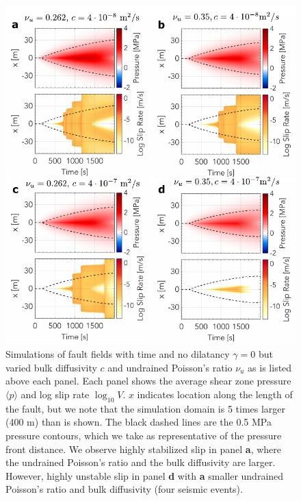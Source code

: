 \documentclass[draft]{agujournal2019}
\begin{document}
\begin{figure}[H]
\centering
\includegraphics[scale = 0.95]{Figures/gamma0_comparison.pdf} %
\caption{Simulations of fault fields with time and no dilatancy $\gamma = 0$ but varied bulk diffusivity $c$ and undrained Poisson's ratio $\nu_u$ as is listed above each panel. Each panel shows the average shear zone pressure $\langle p \rangle$ and log slip rate  $\log_{10}{V}$. $x$ indicates location along the length of the fault, but we note that the simulation domain is 5 times larger (400 m) than is shown. The black dashed lines are the 0.5 MPa pressure contours, which we take as representative of the pressure front distance. We observe highly stabilized slip in panel {\bf a}, where the undrained Poisson's ratio and the bulk diffusivity are larger. However, highly unstable slip in panel {\bf d} with {\bf a} smaller undrained Poisson's ratio and bulk diffusivity (four seismic events).}
\label{fig:Appg0}
\end{figure}
\end{document}
